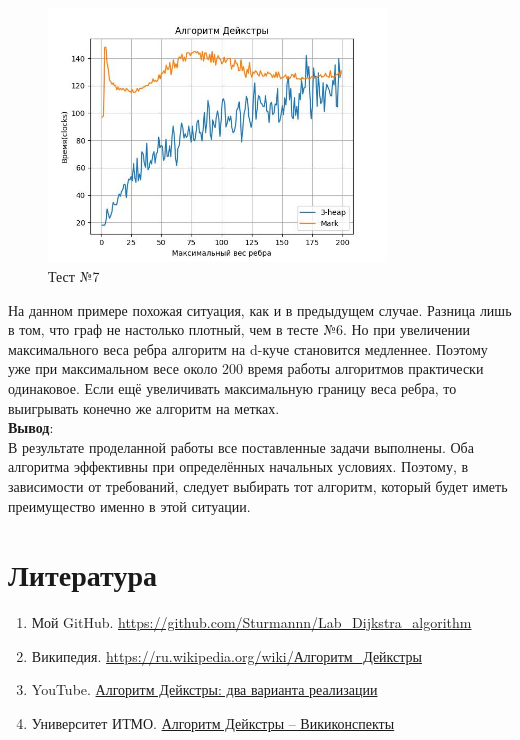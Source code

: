\begin{text}
\begin{center}
\end{center}
\begin{figure}[h]
  \centering
  \includegraphics[width=0.8\textwidth]{pictures/7.jpeg}
  \caption{Тест №7}
  \label{fig:pict_7}
\end{figure}

На данном примере похожая ситуация, как и в предыдущем случае. Разница лишь в том, что граф не настолько плотный, чем в тесте №6. Но при увеличении максимального веса ребра алгоритм на d-куче становится медленнее. Поэтому уже при максимальном весе около $200$ время работы алгоритмов практически одинаковое. Если ещё увеличивать максимальную границу веса ребра, то выигрывать конечно же алгоритм на метках.\\

\textbf{Вывод}:\\
В результате проделанной работы все поставленные задачи выполнены. Оба алгоритма эффективны при определённых начальных условиях. Поэтому, в зависимости от требований, следует выбирать тот алгоритм, который будет иметь преимущество именно в этой ситуации.
\newpage

\section{Литература}

\begin{enumerate}
	\item Мой GitHub. \url{https://github.com/Sturmannn/Lab_Dijkstra_algorithm}
	\item Википедия. \href{https://ru.wikipedia.org/wiki/%D0%90%D0%BB%D0%B3%D0%BE%D1%80%D0%B8%D1%82%D0%BC_%D0%94%D0%B5%D0%B9%D0%BA%D1%81%D1%82%D1%80%D1%8B}{https://ru.wikipedia.org/wiki/Алгоритм\_Дейкстры}
	\item YouTube. \href{https://www.youtube.com/watch?v=J-7MzbEtTR0&t=2s}{Алгоритм Дейкстры: два варианта реализации}
	\item Университет ИТМО. \href{https://neerc.ifmo.ru/wiki/index.php?title=%D0%90%D0%BB%D0%B3%D0%BE%D1%80%D0%B8%D1%82%D0%BC_%D0%94%D0%B5%D0%B9%D0%BA%D1%81%D1%82%D1%80%D1%8B}{Алгоритм Дейкстры -- Викиконспекты}
\end{enumerate}

\end{text}
